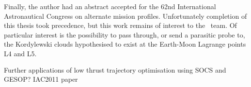 Finally, the author had an abstract accepted for the 62nd International Astronautical Congress on alternate mission profiles. Unfortunately completion of this thesis took precedence, but this work remains of interest to the \BW\ team. Of particular interest is the possibility to pass through, or send a parasitic probe to, the Kordylewski clouds hypothesised to exist at the Earth-Moon Lagrange points L4 and L5.

Further applications of low thrust trajectory optimisation using SOCS and GESOP? IAC2011 paper















